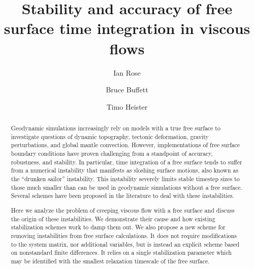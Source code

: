 \documentclass[preprint,12pt,authoryear]{elsarticle}
\begin{document}
\begin{frontmatter}



\title{Stability and accuracy of free surface time integration in viscous flows}


\author{Ian Rose}
\author{Bruce Buffett}
\author{Timo Heister}



\address{}

\begin{abstract}
Geodynamic simulations increasingly rely on models with a true free surface to 
investigate questions of dynamic topography, tectonic deformation, gravity perturbations, and
global mantle convection. However, implementations of free surface boundary conditions 
have proven challenging from a standpoint of accuracy, robustness, and stability.
In particular, time integration of a free surface tends to suffer from a numerical instability
that manifests as sloshing surface motions, also known as the ``drunken sailor'' instability.
This instability severely limits stable timestep sizes to those much smaller than can be used
in geodynamic simulations without a free surface. 
Several schemes have been proposed in the literature to deal with these instabilities.

Here we analyze the problem of creeping viscous flow with a free surface and discuss the 
origin of these instabilities. We demonstrate their cause and how existing stabilization 
schemes work to damp them out.
We also propose a new scheme for removing instabilities from free surface calculations. 
It does not require modifications to the system matrix, nor additional variables, but is instead
an explicit scheme based on nonstandard finite differences.  It relies on a single 
stabilization parameter which may be identified with the smallest relaxation timescale of the
free surface.


\end{abstract}
\end{frontmatter}
\end{document}
